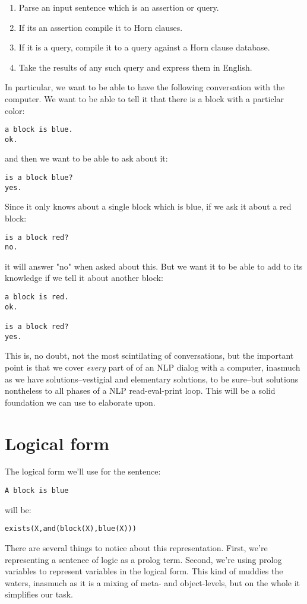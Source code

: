 \documentclass{book}[9pt]
\begin{document}
\begin{enumerate}
\item Parse an input sentence which is an assertion or query.
\item If its an assertion compile it to Horn clauses.
\item If it is a query, compile it to a query against a Horn clause database.
\item Take the results of any such query and express them in English.
\end{enumerate}

\noindent In particular, we want to be able to have the following
conversation with the computer.  We want to be able to tell it that
there is a block with a particlar color:

\begin{verbatim}
a block is blue.
ok.
\end{verbatim}
\noindent and then we want to be able to ask about it:
\begin{verbatim}
is a block blue?
yes.
\end{verbatim}
\noindent  Since it only knows about a single block which is
blue, if we ask it about a red block:
\begin{verbatim}
is a block red?
no.
\end{verbatim}
\noindent it will answer "no" when asked about this.  But
we want it to be able to add to its knowledge if we
tell it about another block:
\begin{verbatim}
a block is red.
ok.

is a block red?
yes.
\end{verbatim}

\noindent This is, no doubt, not the most scintilating of
conversations, but the important point is that we cover {\em every}
part of of an NLP dialog with a computer, inasmuch as we have
solutions--vestigial and elementary solutions, to be sure--but
solutions nontheless to all phases of a NLP read-eval-print loop.
This will be a solid foundation we can use to elaborate upon.

\section{Logical form}

The logical form we'll use for the sentence:
\begin{verbatim}
A block is blue
\end{verbatim}
\noindent will be:
\begin{verbatim}
exists(X,and(block(X),blue(X)))
\end{verbatim}
\noindent There are several things to notice about this
representation.  First, we're representing a sentence of logic as a
prolog term.  Second, we're using prolog variables to represent
variables in the logical form.  This kind of muddies the waters,
inasmuch as it is a mixing of meta- and object-levels, but on the
whole it simplifies our task.
\end{document}
